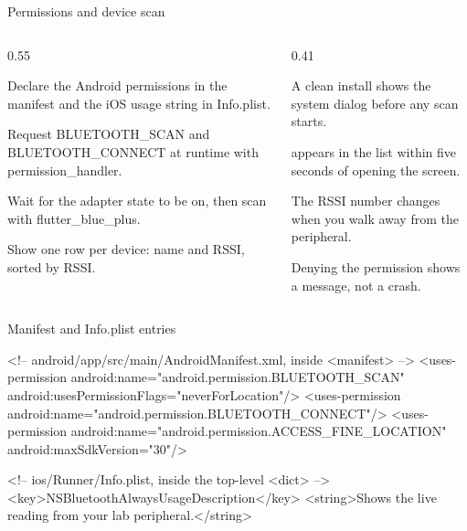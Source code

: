 \documentclass[10pt,aspectratio=169,t]{beamer}
\begin{document}
\begin{frame}[eyebrow=Task I]{Permissions and device scan}
  \begin{columns}[T]
    \begin{column}{0.55\textwidth}
      \begin{steps}
        \item Declare the Android permissions in the manifest and the iOS usage string in Info.plist.
        \item Request BLUETOOTH\_SCAN and BLUETOOTH\_CONNECT at runtime with permission\_handler.
        \item Wait for the adapter state to be on, then scan with flutter\_blue\_plus.
        \item Show one row per device: name and RSSI, sorted by RSSI.
      \end{steps}
    \end{column}
    \begin{column}{0.41\textwidth}
      \begin{checklist}
        \item A clean install shows the system dialog before any scan starts.
        \item {} appears in the list within five seconds of opening the screen.
        \item The RSSI number changes when you walk away from the peripheral.
        \item Denying the permission shows a message, not a crash.
      \end{checklist}
    \end{column}
  \end{columns}
\end{frame}

\begin{frame}[fragile,eyebrow=Reference]{Manifest and Info.plist entries}
\begin{codeblock}
<!-- android/app/src/main/AndroidManifest.xml, inside <manifest> -->
<uses-permission android:name="android.permission.BLUETOOTH_SCAN"
                 android:usesPermissionFlags="neverForLocation"/>
<uses-permission android:name="android.permission.BLUETOOTH_CONNECT"/>
<uses-permission android:name="android.permission.ACCESS_FINE_LOCATION"
                 android:maxSdkVersion="30"/>

<!-- ios/Runner/Info.plist, inside the top-level <dict> -->
<key>NSBluetoothAlwaysUsageDescription</key>
<string>Shows the live reading from your lab peripheral.</string>
\end{codeblock}
  \vskip 2mm
\end{frame}
\end{document}

